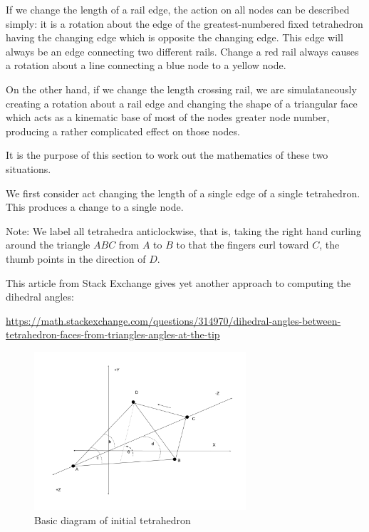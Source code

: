 \documentclass[11pt]{article}
\begin{document}
If we change the length of a rail edge, the action on all nodes can be described simply: it is a rotation about the edge
of the greatest-numbered fixed tetrahedron having the changing edge which is opposite the changing edge. This edge will always
be an edge connecting two different rails. Change a red rail always causes a rotation about a line connecting a blue node to a yellow node.

On the other hand, if we change the length crossing rail, we are simulataneously creating a rotation about a rail edge and
changing the shape of a triangular face which acts as a kinematic base of most of the nodes greater node number, producing a rather
complicated effect on those nodes.

It is the purpose of this section to work out the mathematics of these two situations.

We first consider act changing the length of a single edge of a single tetrahedron. This produces a change to a single node.

Note: We label all tetrahedra anticlockwise, that is, taking the right hand curling around the triangle $ABC$ from $A$ to $B$ to that
the fingers curl toward $C$, the thumb points in the direction of $D$.

This article from Stack Exchange gives yet another approach to computing the
dihedral angles:

\url{https://math.stackexchange.com/questions/314970/dihedral-angles-between-tetrahedron-faces-from-triangles-angles-at-the-tip}

\begin{figure}
  \centering
     \includegraphics[width=0.70\textwidth]{figures/EasyToComputeTetDerivative.png}
     \caption{Basic diagram of initial tetrahedron}
  \label{fig:basic}     
\end{figure}
\end{document}
